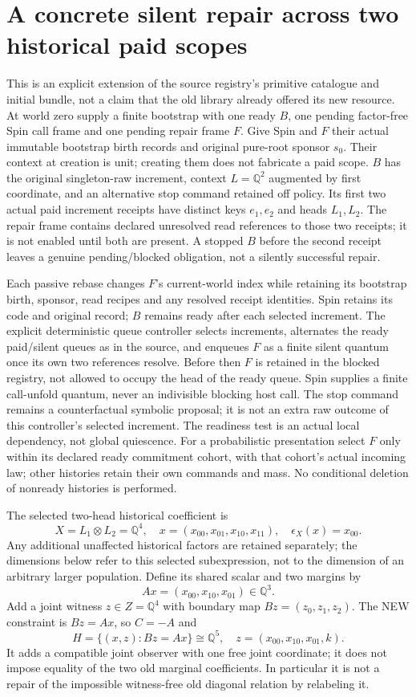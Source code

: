 \documentclass[11pt]{article}
\begin{document}
\section{A concrete silent repair across two historical paid scopes}
This is an explicit extension of the source registry's primitive catalogue and initial bundle, not a claim that the old library already offered its new resource. At world zero supply a finite bootstrap with one ready $B$, one pending factor-free Spin call frame and one pending repair frame $F$. Give Spin and $F$ their actual immutable bootstrap birth records and original pure-root sponsor $s_0$. Their context at creation is unit; creating them does not fabricate a paid scope. $B$ has the original singleton-raw increment, context $L=\mathbb Q^2$ augmented by first coordinate, and an alternative stop command retained off policy. Its first two actual paid increment receipts have distinct keys $e_1,e_2$ and heads $L_1,L_2$. The repair frame contains declared unresolved read references to those two receipts; it is not enabled until both are present. A stopped $B$ before the second receipt leaves a genuine pending/blocked obligation, not a silently successful repair.

Each passive rebase changes $F$'s current-world index while retaining its bootstrap birth, sponsor, read recipes and any resolved receipt identities. Spin retains its code and original record; $B$ remains ready after each selected increment. The explicit deterministic queue controller selects increments, alternates the ready paid/silent queues as in the source, and enqueues $F$ as a finite silent quantum once its own two references resolve. Before then $F$ is retained in the blocked registry, not allowed to occupy the head of the ready queue. Spin supplies a finite call-unfold quantum, never an indivisible blocking host call. The stop command remains a counterfactual symbolic proposal; it is not an extra raw outcome of this controller's selected increment. The readiness test is an actual local dependency, not global quiescence. For a probabilistic presentation select $F$ only within its declared ready commitment cohort, with that cohort's actual incoming law; other histories retain their own commands and mass. No conditional deletion of nonready histories is performed.

The selected two-head historical coefficient is
\[
 X=L_1\otimes L_2=\mathbb Q^4,
 \quad x=(x_{00},x_{01},x_{10},x_{11}),
 \quad\epsilon_X(x)=x_{00}.
\]
Any additional unaffected historical factors are retained separately; the dimensions below refer to this selected subexpression, not to the dimension of an arbitrary larger population. Define its shared scalar and two margins by
\[
 A x=(x_{00},x_{10},x_{01})\in\mathbb Q^3.
\]
Add a joint witness $z\in Z=\mathbb Q^4$ with boundary map
$Bz=(z_0,z_1,z_2)$. The NEW constraint is $Bz=Ax$, so $C=-A$ and
\[
 H=\{(x,z):Bz=Ax\}\cong\mathbb Q^5,
 \quad z=(x_{00},x_{10},x_{01},k).
\]
It adds a compatible joint observer with one free joint coordinate; it does not impose equality of the two old marginal coefficients. In particular it is not a repair of the impossible witness-free old diagonal relation by relabeling it.
\end{document}
